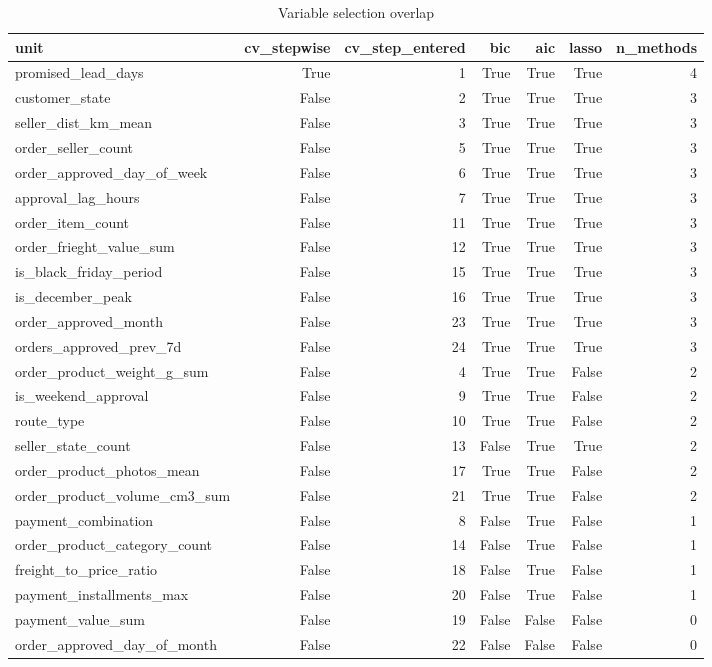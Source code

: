 \begin{table}[htbp]
\centering
\small
\caption{Variable selection overlap}
\begin{tabular}{lrrrrrr}
\toprule
unit & cv\_stepwise & cv\_step\_entered & bic & aic & lasso & n\_methods \\
\midrule
promised\_lead\_days & True & 1 & True & True & True & 4 \\
customer\_state & False & 2 & True & True & True & 3 \\
seller\_dist\_km\_mean & False & 3 & True & True & True & 3 \\
order\_seller\_count & False & 5 & True & True & True & 3 \\
order\_approved\_day\_of\_week & False & 6 & True & True & True & 3 \\
approval\_lag\_hours & False & 7 & True & True & True & 3 \\
order\_item\_count & False & 11 & True & True & True & 3 \\
order\_frieght\_value\_sum & False & 12 & True & True & True & 3 \\
is\_black\_friday\_period & False & 15 & True & True & True & 3 \\
is\_december\_peak & False & 16 & True & True & True & 3 \\
order\_approved\_month & False & 23 & True & True & True & 3 \\
orders\_approved\_prev\_7d & False & 24 & True & True & True & 3 \\
order\_product\_weight\_g\_sum & False & 4 & True & True & False & 2 \\
is\_weekend\_approval & False & 9 & True & True & False & 2 \\
route\_type & False & 10 & True & True & False & 2 \\
seller\_state\_count & False & 13 & False & True & True & 2 \\
order\_product\_photos\_mean & False & 17 & True & True & False & 2 \\
order\_product\_volume\_cm3\_sum & False & 21 & True & True & False & 2 \\
payment\_combination & False & 8 & False & True & False & 1 \\
order\_product\_category\_count & False & 14 & False & True & False & 1 \\
freight\_to\_price\_ratio & False & 18 & False & True & False & 1 \\
payment\_installments\_max & False & 20 & False & True & False & 1 \\
payment\_value\_sum & False & 19 & False & False & False & 0 \\
order\_approved\_day\_of\_month & False & 22 & False & False & False & 0 \\
\bottomrule
\end{tabular}
\par\smallskip\begin{minipage}{\linewidth}\footnotesize \end{minipage}
\end{table}

